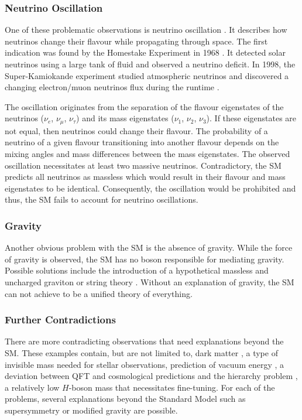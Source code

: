 \documentclass[bachelor,ngerman,english]{GAUBM}
\begin{document}
\subsubsection*{Neutrino Oscillation}
One of these problematic observations is neutrino oscillation \cite{bsm_neutrino_oscillation_01,bsm_neutrino_oscillation_03}. It describes how neutrinos change their flavour while propagating through space. The first indication was found by the Homestake Experiment in 1968 \cite{bsm_neutrino_oscillation_04}. It detected solar neutrinos using a large tank of fluid and observed a neutrino deficit. In 1998, the Super-Kamiokande experiment studied atmospheric neutrinos and discovered a changing electron/muon neutrinos flux during the runtime \cite{bsm_neutrino_oscillation_02}. 

The oscillation originates from the separation of the flavour eigenstates of the neutrinos ($\nu_e$, $\nu_\mu$, $\nu_\tau$) and its mass eigenstates ($\nu_1$, $\nu_2$, $\nu_3$). If these eigenstates are not equal, then neutrinos could change their flavour. The probability of a neutrino of a given flavour transitioning into another flavour depends on the mixing angles and mass differences between the mass eigenstates. The observed oscillation necessitates at least two massive neutrinos. Contradictory, the SM predicts all neutrinos as massless which would result in their flavour and mass eigenstates to be identical. Consequently, the oscillation would be prohibited and thus, the SM fails to account for neutrino oscillations. 

\subsubsection*{Gravity}
Another obvious problem with the SM is the absence of gravity. While the force of gravity is observed, the SM has no boson responsible for mediating gravity. Possible solutions include the introduction of a hypothetical massless and uncharged graviton \cite{bsm_gravity_01} or string theory \cite{bsm_gravity_02}. Without an explanation of gravity, the SM can not achieve to be a unified theory of everything. 

\subsubsection*{Further Contradictions}
There are more contradicting observations that need explanations beyond the SM. These examples contain, but are not limited to, dark matter \cite{bsm_dark_matter_01,bsm_dark_matter_02,bsm_dark_matter_03}, a type of invisible mass needed for stellar observations, prediction of vacuum energy \cite{bsm_vacuum_energy}, a deviation between QFT and cosmological predictions and the hierarchy problem \cite{bsm_hierarchy}, a relatively low $H$-boson mass that necessitates fine-tuning. For each of the problems, several explanations beyond the Standard Model such as supersymmetry \cite{bsm_supersymmetry} or modified gravity \cite{bsm_mond} are possible.
\end{document}
